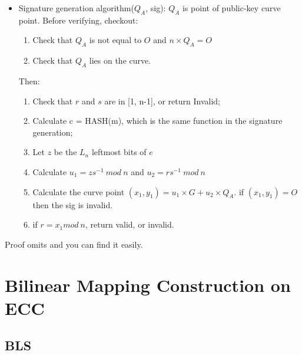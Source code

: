 \documentclass[a4paper,11pt]{article}
\begin{document}
\begin{itemize}
\item Signature generation algorithm($Q_A$, sig):  $Q_A$ is point of public-key curve point.
Before verifying, checkout: 
\begin{enumerate}
\item Check that $Q_A$ is not equal to $O$ and $n \times Q_A = O$
\item Check that $Q_A$ lies on the curve.
\end{enumerate}

Then:
\begin{enumerate}
\item Check that $r$ and $s$ are in [1, n-1], or return Invalid;
\item Calculate c = HASH(m), which is the same function in the signature generation;
\item Let $z$ be the $L_n$ leftmost bits of $e$
\item Calculate $u_1 = zs^{-1}\ mod\ n$  and $u_2 = rs^{-1}\ mod\ n$
\item Calculate the curve point $(x_1, y_1) =  u_1 \times G + u_2 \times Q_A$. if $(x_1, y_1) = O$ then the sig is invalid.
\item if $ r = x_1 mod\ n$, return valid, or invalid.
\end{enumerate}

\end{itemize}
Proof omits and you can find it easily. 


\section{Bilinear Mapping Construction on ECC}
\subsection {BLS}





\end{document}
